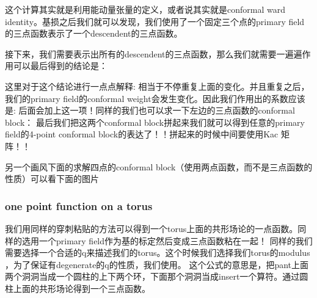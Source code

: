 这个计算其实就是利用能动量张量的定义，或者说其实就是conformal ward identity。基损之后我们就可以发现，我们使用了一个固定三个点的primary field的三点函数表示了一个descendent的三点函数。

接下来，我们需要表示出所有的descendent的三点函数，那么我们就需要一遍遍作用可以最后得到的结论是：

这里对于这个结论进行一点点解释:
相当于不停重复上面的变化。并且重复之后，我们的primary field的conformal weight会发生变化。因此我们作用出的系数应该是:
后面会加上这一项！同样的我们也可以求一下左边的三点函数的conformal block：
最后我们把这两个conformal block拼起来我们就可以得到任意的primary field的4-point conformal block的表达了！！拼起来的时候中间要使用Kac 矩阵！！

\line
另一个画风下面的求解四点的conformal block（使用两点函数，而不是三点函数的性质）可以看下面的图片

\subsubsection{one point function on a torus}
我们用同样的穿刺粘贴的方法可以得到一个torus上面的共形场论的一点函数。同样的选用一个primary field作为基的标定然后变成三点函数粘在一起！
同样的我们需要选择一个合适的q来描述我们的torus。这个时候我们选择我们torus的modulus \seq{\tau}，为了保证有degenerate的q的性质，我们使用。
这个公式的意思是，把pant上面两个洞洞当成一个圆柱的上下两个环，下面那个洞洞当成insert一个算符。通过圆柱上面的共形场论得到一个三点函数。
